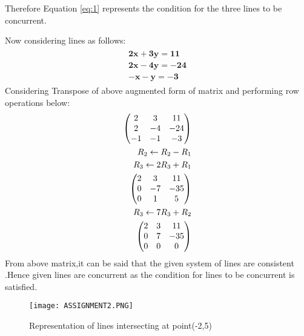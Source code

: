 \documentclass[journal,12pt,twocolumn]{IEEEtran}
\begin{document}
Therefore Equation \eqref{eq:1} represents the condition for the three lines to be concurrent.

Now considering lines as follows:
\begin{align}
\begin{split}
\mathbf{2x + 3y = 11}\\
\mathbf{2x -4y =-24}\\
\mathbf{-x-y =-3}
\end{split}
\end{align}
Considering Transpose of above augmented form of matrix and performing row operations below:
\begin{align}
\begin{split}
\begin{pmatrix}2&3&11\\2&-4&-24\\-1&-1&-3\end{pmatrix}\\
R_2\leftarrow {R_2-R_1}\\
R_3\leftarrow {2R_3+R_1}\\
\begin{pmatrix}2&3&11\\0&-7&-35\\0&1&5\end{pmatrix}\\
R_3\leftarrow {7R_3+R_2}\\
\begin{pmatrix}2&3&11\\0&7&-35\\0&0&0\end{pmatrix}
\end{split}
\end{align}
From above matrix,it can be said that the given system of lines are consistent .Hence given lines are concurrent as the condition for lines to be concurrent is satisfied.
\begin{figure}[!ht]
    \centering
    \texttt{[image: ASSIGNMENT2.PNG]}
    \caption{Representation of lines intersecting at point(-2,5)}
    \label{fig:}
\end{figure}
\end{document}
